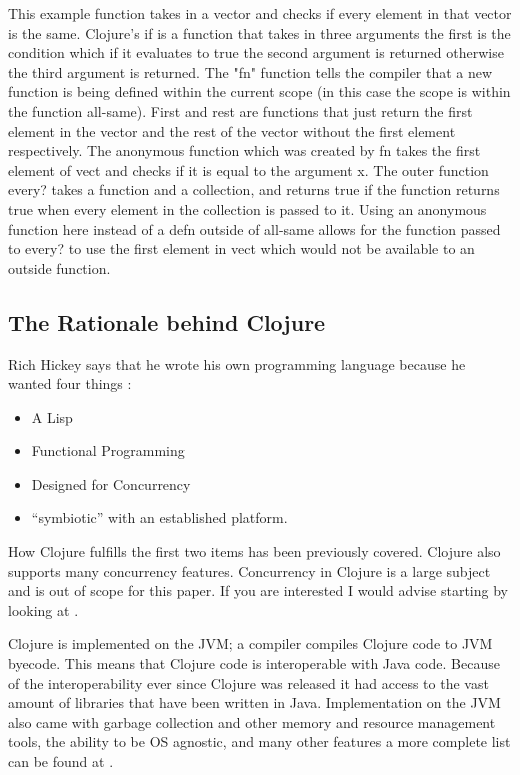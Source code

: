 \documentclass[12pt]{article}
\begin{document}
	This example function takes in a vector and checks if every element in that vector is the same. Clojure's if is a function that takes in three arguments the first is the condition which if it evaluates to true the second argument is returned otherwise the third argument is returned. The "fn" function tells the compiler that a new function is being defined within the current scope (in this case the scope is within the function all-same). First and rest are functions that just return the first element in the vector and the rest of the vector without the first element respectively. The anonymous function which was created by fn takes the first element of vect and checks if it is equal to the argument x. The outer function every? takes a function and a collection, and returns true if the function returns true when every element in the collection is passed to it. Using an anonymous function here instead of a defn outside of all-same allows for the function passed to every? to use the first element in vect which would not be available to an outside function.
	
	\subsection{The Rationale behind Clojure}
	Rich Hickey says that he wrote his own programming language because he wanted four things \cite{cloj:rationale}:
	\begin{itemize}
		\item A Lisp
		\item Functional Programming
		\item Designed for Concurrency
		\item ``symbiotic'' with an established platform.
	\end{itemize}
	
	How Clojure fulfills the first two items has been previously covered. Clojure also supports many concurrency features. Concurrency in Clojure is a large subject and is out of scope for this paper. If you are interested I would advise starting by looking at \cite{cloj:concurrency}.
	
	Clojure is implemented on the JVM; a compiler compiles Clojure code to JVM byecode. This means that Clojure code is interoperable with Java code. Because of the interoperability ever since Clojure was released it had access to the vast amount of libraries that have been written in Java. Implementation on the JVM also came with garbage collection and other memory and resource management tools, the ability to be OS agnostic, and many other features a more complete list can be found at \cite{cloj:rationale}.   
\end{document}

